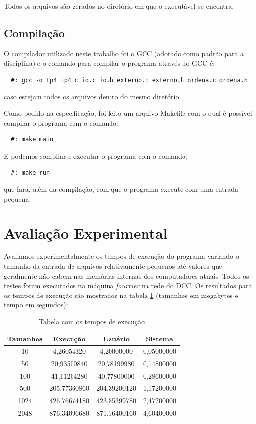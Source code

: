 \documentclass[12pt]{article}
\begin{document}
Todos os arquivos são gerados no diretório em que o executável se encontra.

\subsection{Compilação}
O compilador utilizado neste trabalho foi o GCC (adotado como padrão para a disciplina) e 
o comando para compilar o programa através do GCC é:
\begin{verbatim}
  #: gcc -o tp4 tp4.c io.c io.h externo.c externo.h ordena.c ordena.h
\end{verbatim}
caso estejam todos os arquivos dentro do mesmo diretório.

Como pedido na especificação, foi feito um arquivo Makefile com o qual é possível compilar
o programa com o comando: 
\begin{verbatim}
  #: make main
\end{verbatim}

E podemos compilar e executar o programa com o comando:
\begin{verbatim}
  #: make run
\end{verbatim}
que fará, além da compilação, com que o programa execute com uma entrada pequena.

\section{Avaliação Experimental}
\label{avaliacao_experimental}

Avaliamos experimentalmente os tempos de execução do programa variando o tamanho da entrada
de arquivos relativamente pequenos até valores que geralmente não cabem nas memórias internas 
dos computadores atuais. Todos os testes foram executados na máquina \textit{fourrier} na rede 
do DCC. Os resultados para os tempos de execução são mostrados na tabela \ref{tempossss} (tamanhos em megabytes 
e tempo em segundos):

\begin{table}[htb]
\centering
\caption{Tabela com os tempos de execução}
\label{tempossss}
\begin{tabular}{|c|c|c|c|}
\hline Tamanhos & Execução & Usuário & Sistema \\ 
\hline 10 & 4,26054320
 & 4,20000000
 & 0,05000000
 \\ 
\hline 50 & 20,93500840
 & 20,78199980
 & 0,14800000
 \\ 
\hline 100 & 41,11264280
 & 40,77800000
 & 0,28600000
 \\ 
\hline 500 & 205,77360860
 & 204,39200120
 & 1,17200000
 \\ 
\hline 1024 & 426,76674180
 & 423,85399780
 & 2,47200000
 \\ 
\hline 2048 & 876,34096680
 & 871,16400160
 & 4,60400000
 \\ 
\hline
\end{tabular} 
\end{table}
\end{document}

